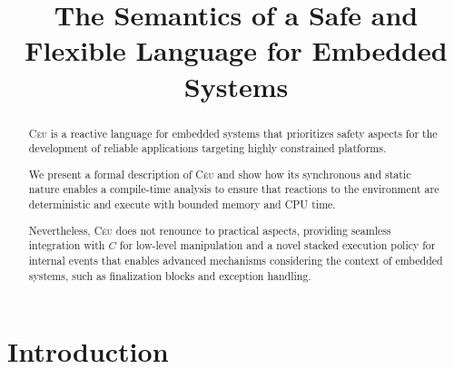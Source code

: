 \documentclass[preprint]{sigplanconf}
\newcommand{\CEU}{\textsc{C\'{e}u}\xspace}
\newcommand{\1}{\;}
\newcommand{\2}{\;\;}
\newcommand{\3}{\;\;\;}
\newcommand{\5}{\;\;\;\;\;}
\begin{document}
  \copyrightdata{[to 
be supplied]} 


\title{The Semantics of a Safe and Flexible Language for Embedded Systems}

\authorinfo{}{}{}

\maketitle

\begin{abstract}
\CEU is a reactive language for embedded systems that prioritizes safety 
aspects for the development of reliable applications targeting highly 
constrained platforms.

We present a formal description of \CEU and show how its synchronous and static 
nature enables a compile-time analysis to ensure that reactions to the 
environment are deterministic and execute with bounded memory and CPU time.

Nevertheless, \CEU does not renounce to practical aspects, providing seamless 
integration with $C$ for low-level manipulation and a novel stacked execution 
policy for internal events that enables advanced mechanisms considering the 
context of embedded systems, such as finalization blocks and exception 
handling.
\end{abstract}




\section{Introduction}
\end{document}

